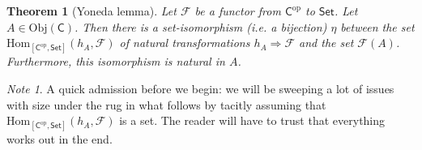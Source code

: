 \documentclass[a4paper,10pt]{scrreprt}
\newcommand{\Obj}{\mathrm{Obj}}
\newcommand{\Hom}{\mathrm{Hom}}
\theoremstyle{definition}
\theoremstyle{plain}
\newtheorem{theorem}{Theorem}[section]
\theoremstyle{remark}
\newtheorem{note}{Note}[section]
\begin{document}
\begin{theorem}[Yoneda lemma]
  Let $\mathcal{F}$ be a functor from $\mathsf{C}^{\mathrm{op}}$ to $\mathsf{Set}$. Let $A \in \Obj(\mathsf{C})$. Then there is a set-isomorphism (i.e. a bijection) $\eta$ between the set $\Hom_{[\mathsf{C}^{\text{op}}, \mathsf{Set}]}(h_{A}, \mathcal{F})$ of natural transformations $h_{A} \Rightarrow \mathcal{F}$ and the set $\mathcal{F}(A)$. Furthermore, this isomorphism is natural in $A$.
\end{theorem}
\begin{note}
  A quick admission before we begin: we will be sweeping a lot of issues with size under the rug in what follows by tacitly assuming that $\Hom_{[\mathsf{C}^{\text{op}}, \mathsf{Set}]}(h_{A}, \mathcal{F})$ is a set. The reader will have to trust that everything works out in the end.
\end{note}
\end{document}
